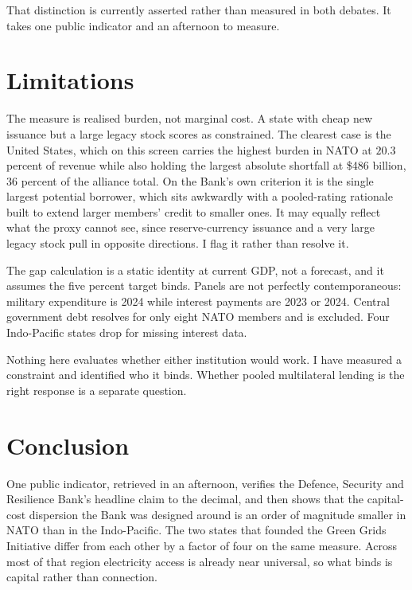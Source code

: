 \documentclass[10pt,twocolumn]{article}
\begin{document}
That distinction is currently asserted rather than measured in both debates. It
takes one public indicator and an afternoon to measure.

\section{Limitations}
\label{sec:limits}

The measure is realised burden, not marginal cost. A state with cheap new issuance
but a large legacy stock scores as constrained. The clearest case is the United
States, which on this screen carries the highest burden in NATO at $20.3$ percent
of revenue while also holding the largest absolute shortfall at \$486 billion,
$36$ percent of the alliance total. On the Bank's own criterion it is the single
largest potential borrower, which sits awkwardly with a pooled-rating rationale
built to extend larger members' credit to smaller ones. It may equally reflect what
the proxy cannot see, since reserve-currency issuance and a very large legacy stock
pull in opposite directions. I flag it rather than resolve it.

The gap calculation is a static identity at current GDP, not a forecast, and it
assumes the five percent target binds. Panels are not perfectly contemporaneous:
military expenditure is 2024 while interest payments are 2023 or 2024. Central
government debt resolves for only eight NATO members and is excluded. Four
Indo-Pacific states drop for missing interest data.

Nothing here evaluates whether either institution would work. I have measured a
constraint and identified who it binds. Whether pooled multilateral lending is the
right response is a separate question.

\section{Conclusion}

One public indicator, retrieved in an afternoon, verifies the Defence, Security and
Resilience Bank's headline claim to the decimal, and then shows that the
capital-cost dispersion the Bank was designed around is an order of magnitude
smaller in NATO than in the Indo-Pacific. The two states that founded the Green
Grids Initiative differ from each other by a factor of four on the same measure.
Across most of that region electricity access is already near universal, so what
binds is capital rather than connection.
\end{document}
